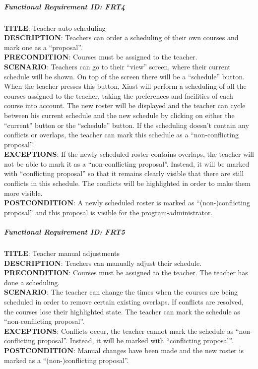 \documentclass[12pt]{article}
\begin{document}
\subparagraph{Functional Requirement \textbf{ID}:
FRT4}\label{functional-requirement-id-frt4}

\textbf{TITLE}: Teacher auto-scheduling\\\textbf{DESCRIPTION}: Teachers
can order a scheduling of their own courses and mark one as a
``proposal''.\\\textbf{PRECONDITION}: Courses must be assigned to the
teacher.\\\textbf{SCENARIO}: Teachers can go to their ``view'' screen,
where their current schedule will be shown. On top of the screen there
will be a ``schedule'' button. When the teacher presses this button,
Xiast will perform a scheduling of all the courses assigned to the
teacher, taking the preferences and facilities of each course into
account. The new roster will be displayed and the teacher can cycle
between his current schedule and the new schedule by clicking on either
the ``current'' button or the ``schedule'' button. If the scheduling
doesn't contain any conflicts or overlaps, the teacher can mark this
schedule as a ``non-conflicting proposal''.\\\textbf{EXCEPTIONS}: If the
newly scheduled roster contains overlaps, the teacher will not be able
to mark it as a ``non-conflicting proposal''. Instead, it will be marked
with ``conflicting proposal'' so that it remains clearly visible that
there are still conflicts in this schedule. The conflicts will be
highlighted in order to make them more visible.\\\textbf{POSTCONDITION}:
A newly scheduled roster is marked as ``(non-)conflicting proposal'' and
this proposal is visible for the program-administrator.

\subparagraph{Functional Requirement \textbf{ID}:
FRT5}\label{functional-requirement-id-frt5}

\textbf{TITLE}: Teacher manual adjustments\\\textbf{DESCRIPTION}:
Teachers can manually adjust their schedule.\\\textbf{PRECONDITION}:
Courses must be assigned to the teacher. The teacher has done a
scheduling.\\\textbf{SCENARIO}: The teacher can change the times when
the courses are being scheduled in order to remove certain existing
overlaps. If conflicts are resolved, the courses lose their highlighted
state. The teacher can mark the schedule as ``non-conflicting
proposal''.\\\textbf{EXCEPTIONS}: Conflicts occur, the teacher cannot
mark the schedule as ``non-conflicting proposal''. Instead, it will be
marked with ``conflicting proposal''.\\\textbf{POSTCONDITION}: Manual
changes have been made and the new roster is marked as a
``(non-)conflicting proposal''.
\end{document}
